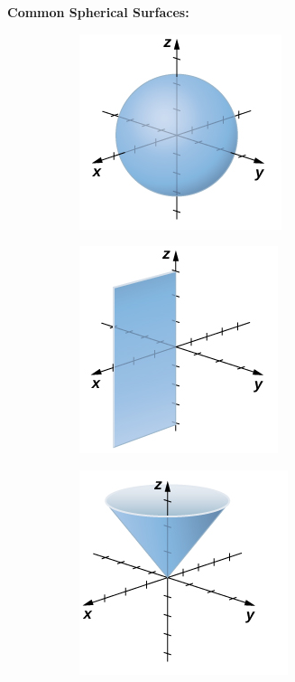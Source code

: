         \noindent \textbf{Common Spherical Surfaces:} \\

        \begin{figure} [hbt!]
            \centering
            \begin{subfigure}{.33\textwidth}
                \includegraphics[scale=0.6]{Resources/Unit3Vectors/sphere.PNG}
            \end{subfigure}
            \begin{subfigure}{.33\textwidth}
                \includegraphics[scale=0.6]{Resources/Unit3Vectors/halfplane.PNG}
            \end{subfigure}
            \begin{subfigure}{.33\textwidth}
                \includegraphics[scale=0.6]{Resources/Unit3Vectors/halfcone.PNG}
            \end{subfigure}
        \end{figure}


